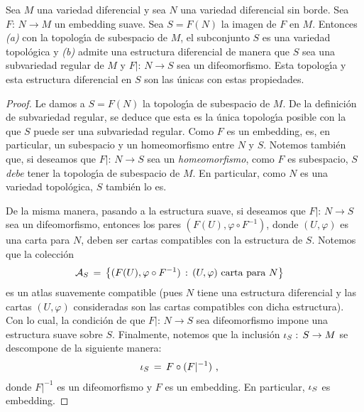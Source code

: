 \begin{propoEmbeddingEsEmbedding}\label{thm:embeddingesembedding}
	Sea $M$ una variedad diferencial y sea $N$ una variedad diferencial
	sin borde. Sea $F:\,N\rightarrow M$ un embedding suave. Sea
	$S=F(N)$ la imagen de $F$ en $M$. Entonces \emph{(a)} con la
	topolog\'{\i}a de subespacio de $M$, el subconjunto $S$ es una
	variedad topol\'{o}gica y \emph{(b)} admite una estructura
	diferencial de manera que $S$ sea una subvariedad regular de $M$ y
	$F|:\,N\rightarrow S$ sea un difeomorfismo. Esta topolog\'{\i}a
	y esta estructura diferencial en $S$ son las \'{u}nicas con
	estas propiedades.
\end{propoEmbeddingEsEmbedding}

\begin{proof}
	Le damos a $S=F(N)$ la topolog\'{\i}a de subespacio de $M$.
	De la definici\'{o}n de subvariedad regular, se deduce que esta
	es la \'{u}nica topolog\'{\i}a posible con la que $S$ puede ser
	una subvariedad regular. Como $F$ es un embedding, es, en
	particular, un subespacio y un homeomorfismo entre $N$ y $S$.
	Notemos tambi\'{e}n que, si deseamos que $F|:\,N\rightarrow S$
	sea un \emph{homeomorfismo}, como $F$ es subespacio, $S$ \emph{debe}
	tener la topolog\'{\i}a de subespacio de $M$. En particular, como
	$N$ es una variedad topol\'{o}gica, $S$ tambi\'{e}n lo es.
	
	De la misma manera, pasando a la estructura suave, si deseamos que
	$F|:\,N\rightarrow S$ sea un difeomorfismo, entonces los pares
	$(F(U),\varphi\circ F^{-1})$, donde $(U,\varphi)$ es una carta
	para $N$, deben ser cartas compatibles con la estructura de $S$.
	Notemos que la colecci\'{o}n
	\begin{align*}
		\cal{A}_{S} & \,=\,\left\lbrace (F(U),\varphi\circ F^{-1})\,:\,
			(U,\varphi)\text{ carta para } N\right\rbrace
	\end{align*}
	es un atlas suavemente compatible (pues $N$ tiene una estructura
	diferencial y las cartas $(U,\varphi)$ consideradas son las
	cartas compatibles con dicha estructura). Con lo cual, la
	condici\'{o}n de que $F|:\,N\rightarrow S$ sea difeomorfismo
	impone una estructura suave sobre $S$. Finalmente, notemos que
	la inclusi\'{o}n $\inc[S]:\,S\rightarrow M$ se descompone de la
	siguiente manera:
	\begin{align*}
		\inc[S] & \,=\,F\circ (F|^{-1})
		\text{ ,}
	\end{align*}
	donde $F|^{-1}$ es un difeomorfismo y $F$ es un embedding. En
	particular, $\inc[S]$ es embedding.
\end{proof}

